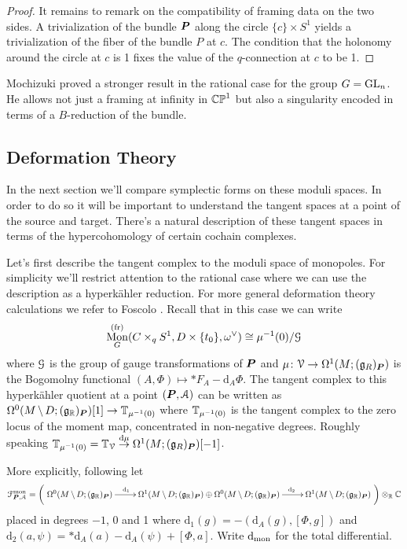 \documentclass[10pt, oneside]{article}
\DeclareMathOperator{\mon}{Mon}
\renewcommand{\d}{\mathrm{d}}
\newcommand{\fr}{\mathrm{fr}}
\begin{document}
\begin{proof}
It remains to remark on the compatibility of framing data on the two sides.  A trivialization of the bundle $\boldsymbol{P}$ along the circle $\{c\} \times S^1$ yields a trivialization of the fiber of the bundle $P$ at $c$.  The condition that the holonomy around the circle at $c$ is 1 fixes the value of the $q$-connection at $c$ to be 1. 
\end{proof}

\begin{remark}
Mochizuki \cite{Mochizuki} proved a stronger result in the rational case for the group $G = \mathrm{GL}_n$.  He allows not just a framing at infinity in $\mathbb{CP}^1$ but also a singularity encoded in terms of a $B$-reduction of the bundle. 
\end{remark}

\subsection{Deformation Theory} \label{def_section}
In the next section we'll compare symplectic forms on these moduli spaces.  In order to do so it will be important to understand the tangent spaces at a point of the source and target.  There's a natural description of these tangent spaces in terms of the hypercohomology of certain cochain complexes.

Let's first describe the tangent complex to the moduli space of monopoles.  For simplicity we'll restrict attention to the rational case where we can use the description as a hyperk\"ahler reduction.  For more general deformation theory calculations we refer to Foscolo \cite{FoscoloDef}.  Recall that in this case we can write
\[\mon^{(\fr)}_G(C \times_q S^1, D \times \{t_0\}, \omega^\vee) \iso \mu^{-1}(0)/ \mc G\]
where $\mathcal{G}$ is the group of gauge transformations of $\boldsymbol{P}$ and $\mu \colon \mathcal{V} \to \Omega^1(M; (\mathfrak{g}_R)_{\boldsymbol{P}})$ is the Bogomolny functional $(A,\Phi) \mapsto \ast F_A - \d_A \Phi$.  The tangent complex to this hyperk\"ahler quotient at a point $(\boldsymbol{P}, \mathcal{A})$ can be written as $\Omega^0(M \!\ \backslash \ \! D; (\mathfrak{g}_{\mathbb{R}})_{\boldsymbol{P}})[1] \to \mathbb{T}_{\mu^{-1}(0)}$ where $\mathbb{T}_{\mu^{-1}(0)}$ is the tangent complex to the zero locus of the moment map, concentrated in non-negative degrees. Roughly speaking $\bb T_{\mu^{-1}(0)} = \bb T_{\mc V} \overset {\d\mu} \to \Omega^1(M; (\gg_R)_{\bo P})[-1]$.  

More explicitly, following \cite{FoscoloDef} let 
\[\mc F^{\mr{mon}}_{\bo P, \mc A} = \left(\xymatrix{
\Omega^0(M \!\bs\! D; (\gg_\RR)_{\bo P}) \ar[r]^(.36){\d_1} &\Omega^1(M \!\bs\! D; (\gg_\RR)_{\bo P}) \oplus \Omega^0(M \!\bs\! D; (\gg_\RR)_{\bo P}) \ar[r]^(.64){\d_2} &\Omega^1(M \!\bs\! D; (\gg_\RR)_{\bo P})
}\right) \otimes_\RR \CC\]
placed in degrees $-1$, 0 and 1 where $\d_1(g) = -(\d_A(g),[\Phi, g])$ and $\d_2(a,\psi) = \ast \d_A(a) - \d_A(\psi) + [\Phi,a]$.  Write $\d_{\mr{mon}}$ for the total differential.
\end{document}
